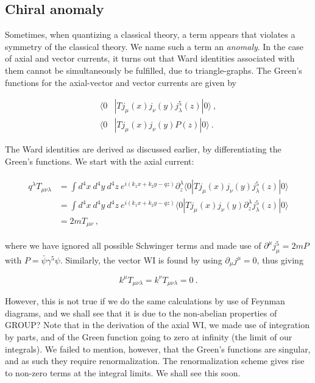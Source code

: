 \documentclass[10pt,twoside]{report}
\begin{document}
	\subsection{Chiral anomaly}\label{subSec | Chiral anomaly}
	Sometimes, when quantizing a classical theory, a term appears that violates a symmetry of the classical theory. We name such a term an \emph{anomaly}. In the case of axial and vector currents, it turns out that Ward identities associated with them cannot be simultaneously be fulfilled, due to triangle-graphs. The Green's functions for the axial-vector and vector currents are given by
	
	\begin{align}
		\langle0&|T j_\mu(x)j_\nu(y)j_ \lambda^5(z)|0\rangle\:, \\
		\langle0&|T j_\mu(x)j_\nu(y)P(z)|0\rangle \:.
	\end{align}
	
	The Ward identities are derived as discussed earlier, by differentiating the Green's functions. We start with the axial current:
	
	\begin{align}
		\begin{split}
		q^\lambda T_{\mu\nu\lambda} &= \int d^4x\:d^4y\:d^4z\:e^{i(k_1x + k_2y - qz)} \partial_z^\lambda\langle0|T j_\mu(x)j_\nu(y)j_ \lambda^5(z)|0\rangle\\
		&= \int d^4x\:d^4y\:d^4z\:e^{i(k_1x + k_2y - qz)} \langle0|T j_\mu(x)j_\nu(y)\partial_z^\lambda j_ \lambda^5(z)|0\rangle \\
		&= 2mT_{\mu\nu}\:,
		\end{split}
	\end{align}
	
	\noindent where we have ignored all possible Schwinger terms and made use of $\partial^\mu j_\mu^5 = 2mP$ with $P=\bar{\psi}\gamma^5\psi$. Similarly, the vector WI is found by using $\partial_ \mu j^\mu = 0$, thus giving
	
	\begin{equation}
		k^\mu T_{\mu\nu\lambda} = k^\nu T_{\mu\nu\lambda} = 0 \:.
	\end{equation}
	
	However, this is not true if we do the same calculations by use of Feynman diagrams, and we shall see that it is due to the non-abelian properties of GROUP? Note that in the derivation of the axial WI, we made use of integration by parts, and of the Green function going to zero at infinity (the limit of our integrals). We failed to mention, however, that the Green's functions are singular, and as such they require renormalization. The renormalization scheme gives rise to non-zero terms at the integral limits. We shall see this soon.\\
	 
\end{document}
